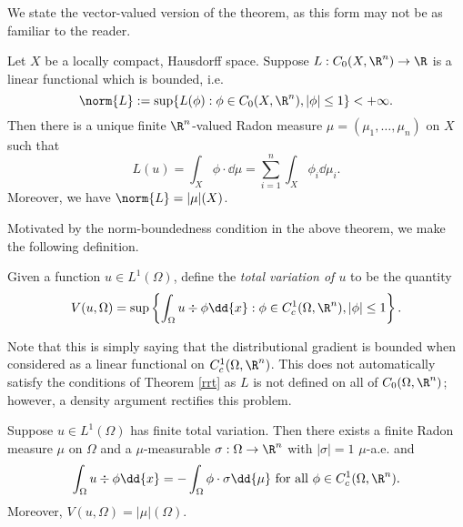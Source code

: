 \documentclass[../main.tex]{subfiles}
\begin{document}
We state the vector-valued version of the theorem, as this form may not be as familiar to the reader. 
\begin{theorem}\label{rrt}
    Let $ X $ be a locally compact, Hausdorff space. Suppose $ L: C_{0}(X,\R^{n})\to \R $ is a linear functional which is bounded, i.e. 
    \[
        \norm{L}:= \sup\{L(\phi) : \phi\in C_{0}(X,\R^{n}), | \phi|\leq 1\} < +\infty.
    \]
    Then there is a unique finite $ \R^{n} $-valued Radon measure $ \mu = (\mu_{1},\ldots, \mu_{n}) $ on $ X $ such that 
    \[
        L(u) = \int_{X} \phi\cdot \dd{\mu} = \sum_{i=1}^{n}\int_{X} \phi_{i} \dd{\mu_{i}}.
    \]
    Moreover, we have $ \norm{L} = | \mu|(X) $.
\end{theorem}
Motivated by the norm-boundedness condition in the above theorem, we make the following definition.
\begin{definition}Given a function $ u\in L^{1}(\Omega) $, define the \textit{total variation of $ u $} to be the quantity
    \[
        V(u,\Omega) = \sup\left\{ \int_{\Omega} u\div{\phi}\dd{x} : \phi\in C_{c}^{1}(\Omega,\R^{n}), | \phi| \leq 1 \right\}.
    \]
\end{definition}
Note that this is simply saying that the  distributional gradient is bounded when considered as a linear functional on $ C_{c}^{1}(\Omega,\R^{n}) $. This does not automatically satisfy the conditions of Theorem \ref{rrt} as $ L $ is not defined on all of $ C_{0}(\Omega,\R^{n}) $; however, a density argument rectifies this problem.

\begin{proposition}[Characterization of $ BV $]\label{bvchar}
    Suppose $ u\in L^{1}(\Omega) $ has finite total variation. Then there exists a finite Radon measure $ \mu $ on $ \Omega $ and a $ \mu $-measurable $ \sigma:\Omega\to \R^{n} $ with $ | \sigma| = 1$ $ \mu $-a.e. and
    \[
        \int_{\Omega} u\div{\phi}\dd{x} = -\int_{\Omega} \phi\cdot \sigma \dd{\mu} \text{ for all } \phi\in C_{c}^{1}(\Omega,\R^{n}).
    \]
    Moreover, $ V(u,\Omega) = | \mu|(\Omega) $.
\end{proposition}
\end{document}
